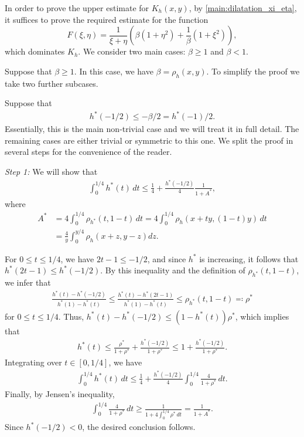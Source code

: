 \documentclass{amsart}
\theoremstyle{plain}
\theoremstyle{definition}
\newenvironment{case}[1]
  {\renewcommand\theinnercustomthm{#1}\innercustomthm}
  {\endinnercustomthm}
\theoremstyle{remark}
\numberwithin{equation}{section}
\numberwithin{theorem}{section}
\numberwithin{conjecture}{section}
\newcommand{\1}{\mathbf 1}
\begin{document}
\bigskip

In order to prove the upper estimate for $K_{h}(x,y)$, by \eqref{main:dilatation_xi_eta}, it suffices to prove the required estimate for the function
\[F(\xi,\eta)=\frac{1}{\xi+\eta}\left(\beta(1+\eta^2)+\frac{1}{\beta}(1+\xi^2)\right),\]
which dominates $K_h$. We consider two main cases: $\beta\geq 1$ and $\beta<1$. 

\begin{case}{1}\label{case1}
Suppose that $\beta \ge 1$. In this case, we have $\beta=\rho_h (x,y)$. To simplify the proof we take two further subcases. 
\end{case}

\begin{case}{1(a)}\label{case1a}
Suppose that
\begin{align}\label{main:case1}
h^*(-1/2)\le -\beta /2=h^*(-1)/2.
\end{align}
Essentially, this is the main non-trivial case and we will treat it in full detail. The remaining cases are either trivial or symmetric to this one. We split the proof in several steps for the convenience of the reader.
\end{case}


\noindent
\textit{Step 1:} We will show that 
\begin{align}\nonumber
\int_0^{1/4} h^*(t)\,dt \le \frac{1}{4}+\frac{h^*(-1/2)}{4}\frac{1}{1+A^*},
\end{align}
where 
\begin{align*}
A^*&=4\int_0^{1/4} \rho_{h^*}(t,1-t)\,dt=4\int_0^{1/4} \rho_{h}(x+ty,(1-t)y)\,dt\\
&=\frac{4}{y}\int_0^{y/4} \rho_{h}(x+z,y-z)dz.
\end{align*}

For $0\le t \le 1/4$, we have $2t-1 \le -1/2$, and since $h^*$ is increasing, it follows that $h^*(2t-1)\le h^*(-1/2)$. By this inequality and the definition of  $\rho_{h^*} (t,1-t)$, we infer that 
\begin{align}\nonumber
\frac{h^*(t)-h^*(-1/2)}{h^*(1)-h^*(t)}\le \frac{h^*(t)-h^*(2t-1)}{h^*(1)-h^*(t)} \le\rho_{h^*} (t,1-t)\eqqcolon  \rho^*
\end{align}
for $0\le t \le 1/4$.
Thus, $h^*(t)-h^*(-1/2)\le (1-h^*(t))\rho^*$, which implies that
\begin{align} \nonumber
h^*(t)\le \frac{\rho^*}{1+\rho^*}+\frac{h^*(-1/2)}{1+\rho^*}\le 1+\frac{h^*(-1/2)}{1+\rho^*}. 
\end{align}
Integrating over $t\in [0,1/4]$, we have
\begin{align*}
\int_0^{1/4} h^*(t)\,dt \le \frac{1}{4}+\frac{h^*(-1/2)}{4} \int_0^{1/4}\frac{4}{1+\rho^*}\,dt.
\end{align*}
Finally, by Jensen's inequality, 
\begin{align*}
\int_0^{1/4}\frac{4}{1+\rho^*}\,dt \ge \frac{1}{1+4\int_0^{1/4}\rho^* \,dt}=\frac{1}{1+A^*}.
\end{align*}
Since $h^*(-1/2)<0$, the desired conclusion follows.
\end{document}
